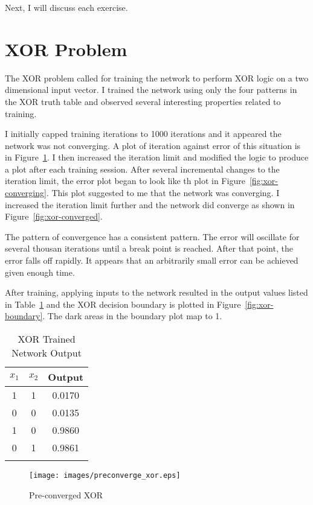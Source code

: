 \documentclass{article}
\begin{document}
Next, I will discuss each exercise.

\section*{XOR Problem}
The XOR problem called for training the network to perform XOR logic
on a two dimensional input vector.  I trained the network using only
the four patterns in the XOR truth table and observed several interesting properties related to training.

I initially capped training iterations to 1000 iterations and it
appeared the network was not converging.  A plot of iteration against
error of this situation is in Figure~\ref{fig:xor-pre}.  I then
increased the iteration limit and modified the logic to produce a plot
after each training session.  After several incremental changes to the
iteration limit, the error plot began to look like th plot in
Figure~\ref{fig:xor-converging}.  This plot suggested to me that the
network was converging.  I increased the iteration limit further and
the network did converge as shown in Figure~\ref{fig:xor-converged}.

The pattern of convergence has a consistent pattern.  The error will
oscillate for several thousan iterations until a break point is
reached. After that point, the error falls off rapidly. It appears
that an arbitrarily small error can be achieved given enough time.

After training, applying inputs to the network resulted in the output
values listed in Table~\ref{table:xor-out} and the XOR decision boundary is plotted in Figure~\ref{fig:xor-boundary}.  The dark areas in the boundary plot map to 1.

\begin{table}
  \begin{center}
    \caption{XOR Trained Network Output}
    \begin{tabular}[c]{ c  c | c }
      $ x_1$  & $x_2$ & Output \\
      \hline
      1 & 1 & 0.0170 \\
      0 & 0 & 0.0135 \\
      1 & 0 & 0.9860 \\
      0 & 1 & 0.9861 \\
      \label{table:xor-out}
    \end{tabular}
  \end{center}
\end{table}


\begin{figure}
  \centering
  \texttt{[image: images/preconverge\_xor.eps]}
  \caption{Pre-converged XOR}
  \label{fig:xor-pre}
\end{figure}
\end{document}
